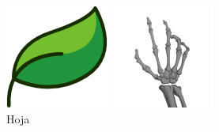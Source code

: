 \begin{figure}[h]
    \centering
    \begin{minipage}{.25\textwidth}
        \includegraphics[width=\textwidth]{imgs/hoja.png}
        \caption{Hoja}
        \label{fig:hoja}
    \end{minipage}
    \begin{minipage}{.25\textwidth}
        \includegraphics[width=\textwidth]{imgs/hand.png}

\end{minipage}
\end{figure}
